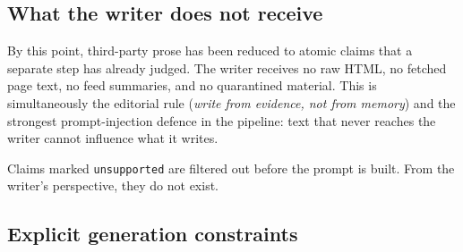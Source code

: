 \documentclass[11pt,a4paper]{article}
\newcommand{\brk}{\hyphenpenalty=0\exhyphenpenalty=0\relax}
\newcommand{\code}[1]{\texttt{\small\brk #1}}
\begin{document}
\subsection{What the writer does not receive}

\begin{blockbox}
By this point, third-party prose has been reduced to atomic claims that a separate
step has already judged. The writer receives no raw HTML, no fetched page text, no
feed summaries, and no quarantined material. This is simultaneously the editorial
rule (\emph{write from evidence, not from memory}) and the strongest
prompt-injection defence in the pipeline: text that never reaches the writer
cannot influence what it writes.

Claims marked \code{unsupported} are filtered out before the prompt is built. From
the writer's perspective, they do not exist.
\end{blockbox}

\subsection{Explicit generation constraints}
\end{document}
